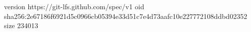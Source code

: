 version https://git-lfs.github.com/spec/v1
oid sha256:2e67186f6921d5c0966cb05394e33d51c7e4d73aafc10e227772108ddbd02352
size 234013
